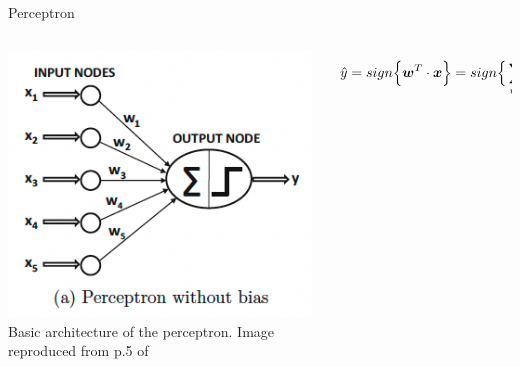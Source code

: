 %
%
%

\begin{frame}[t]{Perceptron}

    \begin{columns}
        \begin{column}{0.50\textwidth}
         \begin{center}
          \includegraphics[width=0.98\textwidth]{./images/perceptron/perceptron_without_bias.png}\\
          \vspace{0.5cm}
          {\scriptsize \color{col:attribution} 
          Basic architecture of the perceptron. 
          Image reproduced from p.5 of \cite{Aggarwal:2018SpringerDL}}\\
         \end{center}
        \end{column}
        \begin{column}{0.50\textwidth}
            \begin{equation}
                \hat{y} = sign\Big\{ \boldsymbol{w}^T \cdot \boldsymbol{x} \Big\} = sign\Big\{ \sum_{i=1}^{d} w_i x_i \Big\}
             \end{equation}        
        \end{column}
      \end{columns}
      
\end{frame}

%
%
%


